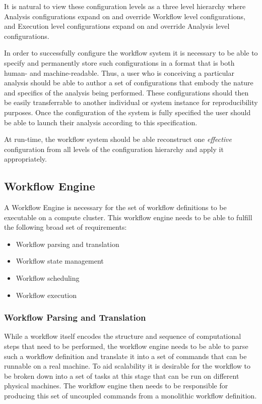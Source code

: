 It is natural to view these configuration levels as a three level hierarchy where Analysis configurations expand on and override Workflow level configurations, and Execution level configurations expand on and override Analysis level configurations.

In order to successfully configure the workflow system it is necessary to be able to specify and permanently store such configurations in a format that is both human- and machine-readable. Thus, a user who is conceiving a particular analysis should be able to author a set of configurations that embody the nature and specifics of the analysis being performed. These configurations should then be easily transferrable to another individual or system instance for reproducibility purposes. Once the configuration of the system is fully specified the user should be able to launch their analysis according to this specification.

At run-time, the workflow system should be able reconstruct one \emph{effective} configuration from all levels of the configuration hierarchy and apply it appropriately.

\subsection {Workflow Engine} \label{sec:workflow_engine}

A Workflow Engine is necessary for the set of workflow definitions to be executable on a compute cluster. This workflow engine needs to be able to fulfill the following broad set of requirements:

\begin{itemize}
\item Workflow parsing and translation
\item Workflow state management
\item Workflow scheduling
\item Workflow execution
\end{itemize}

\subsubsection{Workflow Parsing and Translation}

While a workflow itself encodes the structure and sequence of computational steps that need to be performed, the workflow engine needs to be able to parse such a workflow definition and translate it into a set of commands that can be runnable on a real machine. To aid scalability it is desirable for the workflow to be broken down into a set of tasks at this stage that can be run on different physical machines. The workflow engine then needs to be responsible for producing this set of uncoupled commands from a monolithic workflow definition.

